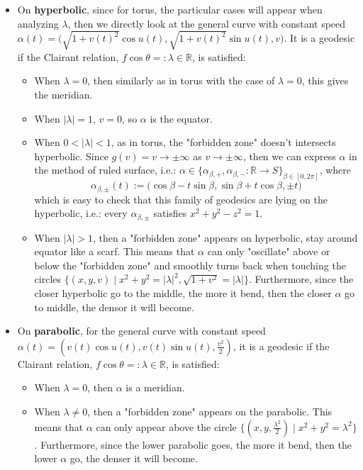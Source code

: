 \begin{itemize}
    \item On \textbf{hyperbolic}, since for torus, the particular cases will appear when analyzing $\lambda$, then we directly look at the general curve with constant speed $\alpha(t)= \big(\sqrt{1+v(t)^2}\cos u(t), \sqrt{1+v(t)^2} \sin u(t), v \big)$. It is a geodesic if the Clairant relation, $f\cos \theta=: \lambda \in \mathbb{R}$, is satisfied:
    \begin{itemize}
        \item When $\lambda=0$, then similarly as in torus with the case of $\lambda=0$, this gives the meridian.
        \item When $|\lambda|=1$, $v=0$, so $\alpha$ is the equator.
        \item When $0<|\lambda|<1$, as in torus, the "forbidden zone" doesn't intersects hyperbolic. Since $g(v)=v \to \pm\infty$ as $v \to \pm\infty$, then we can express $\alpha$ in the method of ruled surface, i.e.: $\alpha \in \{\alpha_{\beta,+}, \alpha_{\beta,-} :\mathbb{R} \to S\}_{\beta\in [0,2\pi]}$, where
        \[
        \alpha_{\beta,\pm} (t):= \big(\cos \beta- t\sin \beta, \sin \beta +t\cos \beta, \pm t\big)
        \]
        which is easy to check that this family of geodesics are lying on the hyperbolic, i.e.: every $\alpha_{\beta,\pm}$ satisfies $x^2+y^2-z^2=1$.
        \item When $|\lambda|>1$, then a "forbidden zone" appears on hyperbolic, stay around equator like a scarf. This means that $\alpha$ can only "oscillate" above or below the "forbidden zone" and smoothly turns back when touching the circles $\{ (x,y,v) \mid x^2+y^2=|\lambda|^2, \sqrt{1+v^2}=|\lambda|\}$. Furthermore, since the closer hyperbolic go to the middle, the more it bend, then the closer $\alpha$ go to middle, the densor it will become.
    \end{itemize}

    \item On \textbf{parabolic}, for the general curve with constant speed $\alpha(t)= (v(t)\cos u(t), v(t)\sin u(t), \frac{v^2}{2})$, it is a geodesic if the Clairant relation, $f\cos \theta=:\lambda \in \mathbb{R}$, is satisfied:
    \begin{itemize}
        \item When $\lambda=0$, then $\alpha$ is a meridian.
        \item When $\lambda \neq 0$, then a "forbidden zone" appears on the parabolic. This means that $\alpha$ can only appear above the circle $\{ (x,y,\frac{\lambda^2}{2}) \mid x^2+y^2 = \lambda^2\}$. Furthermore, since the lower parabolic goes, the more it bend, then the lower $\alpha$ go, the denser it will become.
    \end{itemize}


\end{itemize}
